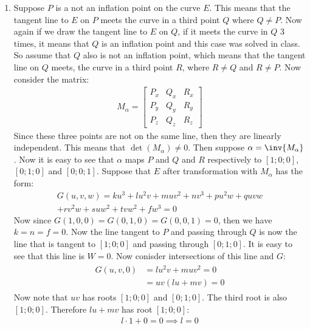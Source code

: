 \begin{enumerate}[label=\ilabel]
    \item 
        Suppose $P$ is a not an inflation point on the curve $E$. This means that the tangent line to $E$ on $P$ meets the curve in a third point $Q$ where $Q \ne P$. Now again if we draw the tangent line to $E$ on $Q$, if it meets the curve in $Q$ 3 times, it means that $Q$ is an inflation point and this case was solved in class. So assume that $Q$ also is not an inflation point, which means that the tangent line on $Q$ meets, the curve in a third point $R$, where $R \ne Q$ and $R \ne P$.
        Now consider the matrix:
        \begin{gather*}
			M_\alpha = 
			\begin{bmatrix}
				P_x & Q_x & R_x \\
				P_y & Q_y & R_y \\
				P_z & Q_z & R_z
			\end{bmatrix}
        \end{gather*}
        Since these three points are not on the same line, then they are linearly independent. This means that $\det (M_\alpha) \ne 0$. Then suppose $\alpha = \inv{M_\alpha}$. Now it is easy to see that $\alpha$ maps $P$ and $Q$ and $R$ respectively to $[1; 0; 0]$, $[0; 1; 0]$ and $[0; 0; 1]$. Suppose that $E$ after transformation with $M_\alpha$ has the form:
        \begin{gather*}
			G(u, v, w) = ku^3 + lu^2v + muv^2 + nv^3 + pu^2w + quvw \\+ rv^2w + suw^2 + tvw^2 + fw^3 = 0
        \end{gather*}
        Now since $G(1, 0, 0) = G(0, 1, 0) = G(0, 0, 1) = 0$, then we have $k = n = f = 0$. Now the line tangent to $P$ and passing through $Q$ is now the line that is tangent to $[1; 0; 0]$ and passing through $[0; 1; 0]$. It is easy to see that this line is $W = 0$. Now conisder intersections of this line and $G$:
        \begin{gather*}
			\begin{split}
				G(u, v, 0) & = lu^2v + muv^2 = 0 \\
				& = uv (lu + mv) = 0
			\end{split}
        \end{gather*}
		Now note that $uv$ has roots $[1; 0; 0]$ and $[0; 1; 0]$. The third root is also $[1; 0; 0]$. Therefore $lu + mv$ has root $[1; 0; 0]$:
		\begin{gather*}
			l \cdot 1 + 0 = 0 \implies l = 0
		\end{gather*}

\end{enumerate}
